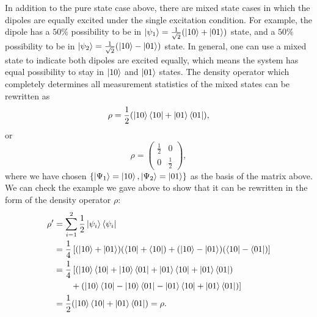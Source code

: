 In addition to the pure state case above, there are mixed state cases in which the dipoles are equally excited under the single excitation condition. For example, the dipole has a $50\%$ possibility to be in $\mathinner{|{\psi_1}\rangle}=\frac{1}{\sqrt{2}}(\mathinner{|{10}\rangle}+\mathinner{|{01}\rangle})$ state, and a $50\%$ possibility to be in $\mathinner{|{\psi_2}\rangle}=\frac{1}{\sqrt{2}}(\mathinner{|{10}\rangle}-\mathinner{|{01}\rangle})$ state. In general, one can use a mixed state to indicate both dipoles are excited equally, which means the system has equal possibility to stay in $\mathinner{|{10}\rangle}$ and $\mathinner{|{01}\rangle}$ states. The density operator which completely determines all measurement statistics of the mixed states can be rewritten as
\begin{equation}
\rho=\frac{1}{2}(\mathinner{|{10}\rangle}\mathinner{\langle{10}|}+\mathinner{|{01}\rangle}\mathinner{\langle{01}|}),
\end{equation}
or
\begin{equation} \label{eq:density_mixed}
\rho=\left( \begin{matrix}
        \frac{1}{2} &   0 \\
        0   &   \frac{1}{2} \end{matrix}\right),
\end{equation}
where we have chosen $\lbrace \mathinner{|{\Psi_1}\rangle}=\mathinner{|{10}\rangle}, \mathinner{|{\Psi_2}\rangle}=\mathinner{|{01}\rangle} \rbrace$ as the basis of the matrix above. We can check the example we gave above to show that it can be rewritten in the form of the density operator $\rho$:
\begin{align}
\rho' &= \sum_{i=1}^2{\frac{1}{2}\mathinner{|{\psi_i}\rangle}\mathinner{\langle{\psi_i}|}}\\
&= \frac{1}{4}\left[ (\mathinner{|{10}\rangle}+\mathinner{|{01}\rangle})(\mathinner{\langle{10}|}+\mathinner{\langle{10}|}) + (\mathinner{|{10}\rangle}-\mathinner{|{01}\rangle})(\mathinner{\langle{10}|}-\mathinner{\langle{01}|}) \right] \\
&= \frac{1}{4}\,[ (\mathinner{|{10}\rangle}\mathinner{\langle{10}|}+\mathinner{|{10}\rangle}\mathinner{\langle{01}|}+\mathinner{|{01}\rangle}\mathinner{\langle{10}|}+ \mathinner{|{01}\rangle}\mathinner{\langle{01}|}) \nonumber \\
&\quad\quad +(\mathinner{|{10}\rangle}\mathinner{\langle{10}|}- \mathinner{|{10}\rangle}\mathinner{\langle{01}|} -\mathinner{|{01}\rangle}\mathinner{\langle{10}|} + \mathinner{|{01}\rangle}\mathinner{\langle{01}|}) ] \\
&= \frac{1}{2} (\mathinner{|{10}\rangle}\mathinner{\langle{10}|}+\mathinner{|{01}\rangle}\mathinner{\langle{01}|})=\rho.
\end{align}

